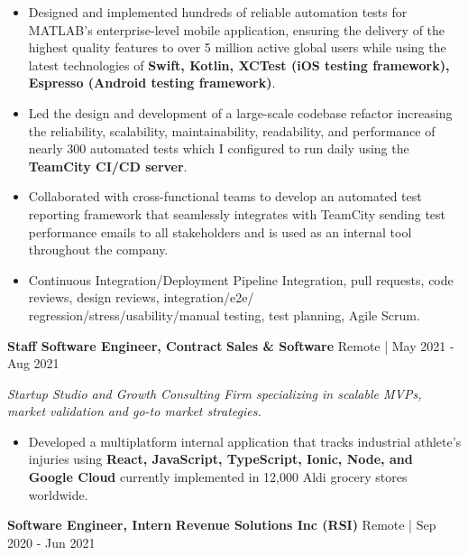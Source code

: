 \documentclass[10pt]{article}
\begin{document}
\begin{itemize}[noitemsep]
    \item Designed and implemented hundreds of reliable automation tests for MATLAB’s enterprise-level mobile application,
    ensuring the delivery of the highest quality features to over 5 million active global users while using the latest
    technologies of \textbf{Swift, Kotlin, XCTest (iOS testing framework), Espresso (Android testing framework)}.
    \item Led the design and development of a large-scale codebase refactor increasing the reliability, scalability, 
    maintainability, readability, and performance of nearly 300 automated tests which I configured to run daily using
    the \textbf{TeamCity CI/CD server}.
    \item Collaborated with cross-functional teams to develop an automated test reporting framework that seamlessly 
    integrates with TeamCity sending test performance emails to all stakeholders and is used as an internal tool 
    throughout the company.
    \item Continuous Integration/Deployment Pipeline Integration, pull requests, code reviews, design reviews, integration/e2e/\\regression/stress/usability/manual testing, test planning, Agile Scrum.
\end{itemize}

\vspace{1pt}

\textbf{Staff Software Engineer, Contract} \hfill \textbf{Sales \& Software} \hfill Remote | May 2021 - Aug 2021

\textit{Startup Studio and Growth Consulting Firm specializing in scalable MVPs, market validation and go-to market strategies.}

\vspace{1pt}

\begin{itemize}[noitemsep]
    \item Developed a multiplatform internal application that tracks industrial athlete's injuries using \textbf{React, JavaScript, TypeScript, Ionic, Node, and Google Cloud} currently 
    implemented in 12,000 Aldi grocery stores worldwide.
\end{itemize}

\vspace{1pt}

\textbf{Software Engineer, Intern} \hfill \textbf{Revenue Solutions Inc (RSI)} \hfill Remote | Sep 2020 - Jun 2021
\end{document}
